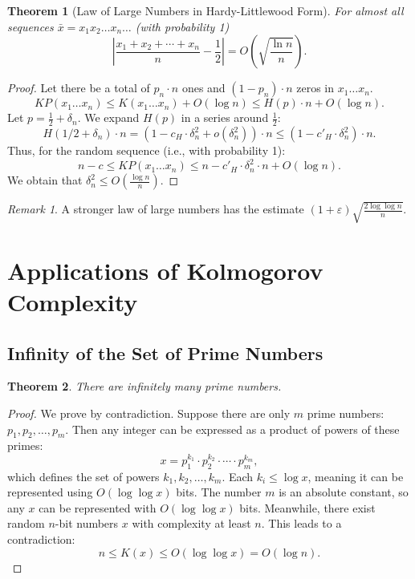 \documentclass[12pt,sans]{article}
\newcommand{\seqn}[2]{{#1}_1,{#1}_2,\dotsc,{#1}_{#2}}
\theoremstyle{definition}
\theoremstyle{plain}
\newtheorem{theorem}{Theorem}[section]
\theoremstyle{remark}
\newtheorem{remark}{Remark}[section]
\begin{document}
\begin{theorem}[Law of Large Numbers in Hardy-Littlewood Form]
    For almost all sequences $\bar{x} = x_1 x_2 \dotso x_n \dotso$ (with probability 1)
    \[
    \left|\frac{x_1 + x_2 + \dotsb + x_n}{n} - \frac{1}{2}\right| =
    O\left(\sqrt{\frac{\ln n}{n}}\right).
    \]
\end{theorem}
\begin{proof}
    Let there be a total of $p_n \cdot n$ ones and $(1 - p_n) \cdot n$ zeros in $x_1 \dotso x_n$.
    \[
    KP(x_1 \dotso x_n) \le K(x_1 \dotso x_n) + O(\log n) \le
    H(p) \cdot n + O(\log n).
    \]
    Let $p = \frac{1}{2} + \delta_n$. We expand $H(p)$ in a series around $\frac{1}{2}$:
    \[
    H(1/2 + \delta_n) \cdot n = (1 - c_H \cdot \delta_n^2 + o(\delta_n^2)) \cdot n
    \le (1 - c'_H \cdot \delta_n^2) \cdot n.
    \]
    Thus, for the random sequence (i.e., with probability 1):
    \[
    n - c \le KP(x_1 \dotso x_n) \le n - c'_H \cdot \delta_n^2 \cdot n + O(\log n).
    \]
    We obtain that $\delta_n^2 \le O\left(\frac{\log n}{n}\right)$.
\end{proof}
\begin{remark}
    A stronger law of large numbers has the estimate
    $(1+\varepsilon)\sqrt{\frac{2 \log \log n}{n}}$.
\end{remark}

\section{Applications of Kolmogorov Complexity}

\subsection{Infinity of the Set of Prime Numbers}
\begin{theorem}
    There are infinitely many prime numbers.
\end{theorem}
\begin{proof}
    We prove by contradiction. Suppose there are only $m$ prime numbers: $\seqn{p}{m}$. Then any integer can be expressed as a product of powers of these primes:
    \[
    x = p_1^{k_1}\cdot p_2^{k_2}\cdot\dotsm\cdot p_m^{k_m},
    \]
    which defines the set of powers $\seqn{k}{m}$. Each $k_i \le \log x$, meaning it can be represented using $O(\log \log x)$ bits. The number $m$ is an absolute constant, so any $x$ can be represented with $O(\log \log x)$ bits. Meanwhile, there exist random $n$-bit numbers $x$ with complexity at least $n$. This leads to a contradiction:
    \[ n \le K(x) \le O(\log \log x) = O(\log n).\]
\end{proof}
\end{document}
